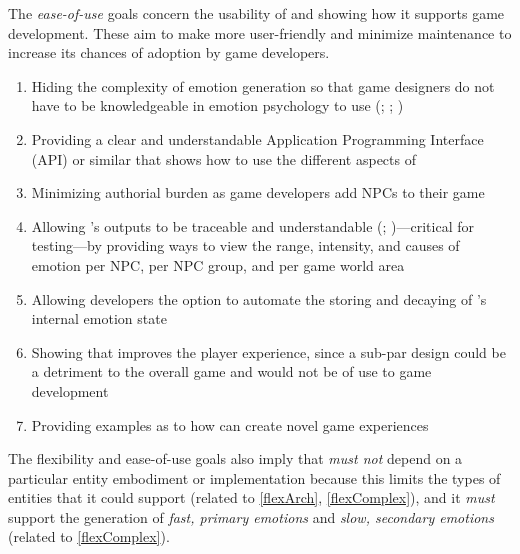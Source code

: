 The \textit{ease-of-use} goals concern the usability of \progname{} and showing
how it supports game development. These aim to make \progname{} more
user-friendly and minimize maintenance to increase its chances of adoption by
game developers.
\begin{enumerate}[label=RE\arabic*]
    \item\label{easeHide} Hiding the complexity of emotion generation so
    that game designers do not have to be knowledgeable in emotion
    psychology to use \progname{} (;
    ; )

    \item\label{easeAPI} Providing a clear and understandable Application
    Programming Interface (API) or similar that shows how to use the
    different aspects of \progname{}~\citep[p.~218]{broekens2016emotional}

    \item\label{easeAuthor} Minimizing authorial burden as game developers
    add NPCs to their game~\citep[p.~5]{guimaraes2022fatima}

    \item\label{easeTrace} Allowing \progname{}'s outputs to be traceable
    and understandable (;
    )---critical for testing---by
    providing ways to view the range, intensity, and causes of emotion per
    NPC, per NPC group, and per game world
    area~\citep[p.~219--220]{broekens2016emotional}

    \item\label{easeAuto} Allowing developers the option to automate the
    storing and decaying of \progname{}'s internal emotion
    state~\citep[p.~86]{loyall1997believable}

    \item\label{easePX} Showing that \progname{} improves the player
    experience, since a sub-par design could be a detriment to the overall
    game and would not be of use to game development

    \item\label{easeNovel} Providing examples as to how \progname{} can
    create novel game experiences~\citep[p.~221]{broekens2016emotional}
\end{enumerate}

The flexibility and ease-of-use goals also imply that \progname{} \textit{must
not} depend on a particular entity embodiment or implementation because this
limits the types of entities that it could support (related to \ref{flexArch},
\ref{flexComplex}), and it \textit{must} support the generation of
\textit{fast, primary emotions} and \textit{slow, secondary
emotions}~\citep[p.~60--70]{picard1997affective} (related to \ref{flexComplex}).
